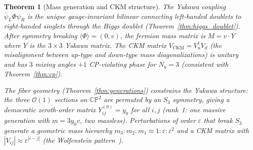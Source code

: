 \documentclass[12pt,a4paper]{article}
\newtheorem{theorem}{Theorem}
\begin{document}
\begin{theorem}[Mass generation and CKM structure]
\label{thm:mass_ckm}
The Yukawa coupling $\bar{\psi}_L \Phi \psi_R$ is the unique gauge-invariant bilinear connecting left-handed doublets to right-handed singlets through the Higgs doublet (Theorem~\ref{thm:higgs_doublet}). After symmetry breaking $\langle\Phi\rangle = (0, v)$, the fermion mass matrix is $M = v \cdot Y$ where $Y$ is the $3 \times 3$ Yukawa matrix. The CKM matrix $V_\mathrm{CKM} = V_u^\dagger V_d$ (the misalignment between up-type and down-type mass diagonalizations) is unitary and has $3$ mixing angles $+ 1$ CP-violating phase for $N_g = 3$ (consistent with Theorem~\ref{thm:cp}).

The fiber geometry (Theorem~\ref{thm:generations}) constrains the Yukawa structure: the three $\mathcal{O}(1)$ sections on $\mathbb{CP}^2$ are permuted by an $S_3$ symmetry, giving a democratic zeroth-order matrix $Y_{ij}^{(0)} = y_0$ for all $i,j$ (rank~1: one massive generation with $m = 3y_0 v$, two massless). Perturbations of order $\varepsilon$ that break $S_3$ generate a geometric mass hierarchy $m_3 : m_2 : m_1 \approx 1 : \varepsilon : \varepsilon^2$ and a CKM matrix with $|V_{ij}| \approx \varepsilon^{|i-j|}$ (the Wolfenstein pattern~\cite{wolfenstein}).
\end{theorem}
\end{document}
